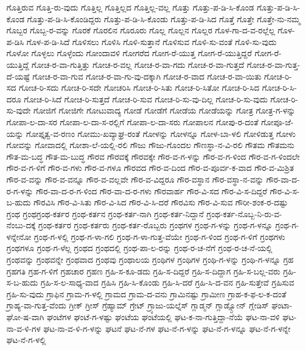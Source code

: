 {ಗೊತ್ತಿರುವ
ಗೊತ್ತಿ-ರು-ವುದು
ಗೊತ್ತಿಲ್ಲ
ಗೊತ್ತಿಲ್ಲದ
ಗೊತ್ತಿಲ್ಲ-ವಲ್ಲ
ಗೊತ್ತು
ಗೊತ್ತು-ಪ-ಡಿ-ಸಿ-ಕೊಂಡ
ಗೊತ್ತು-ಪ-ಡಿ-ಸಿ-ಕೊಂಡ
ಗೊತ್ತು-ಪ-ಡಿ-ಸಿ-ಕೊಂಡಿದ್ದರು
ಗೊತ್ತು-ಪ-ಡಿ-ಸಿ-ಕೊಂಡು
ಗೊತ್ತು-ಪ-ಡಿ-ಸಿದ
ಗೊತ್ತೆ
ಗೊತ್ತೇ
ಗೊತ್ತೇ-ನು-ನಮ್ಮ
ಗೊಬ್ಬರ
ಗೊಬ್ಬ-ರ-ವನ್ನು
ಗೊರಕೆ
ಗೊರಲಿನ
ಗೊರೂರು
ಗೊಲ್ಲ
ಗೊಲ್ಲನ
ಗೊಲ್ಲರ
ಗೊಳ-ಗಾ-ದ-ವ-ರಲ್ಲೆಲ್ಲ
ಗೊಳ-ಪ-ಡಿಸಿ
ಗೊಳ-ಪ-ಡಿ-ಸಿದೆ
ಗೊಳಿಸಲು
ಗೊಳಿಸಿ
ಗೊಳಿ-ಸುತ್ತಾನೆ
ಗೊಳಿಸುವ
ಗೊಳಿ-ಸು-ವಂತೆ
ಗೊಳಿ-ಸು-ವುದು
ಗೊಳೋ
ಗೊಳ್ಳಲು
ಗೊಳ್ಳೆಂದು
ಗೋಂದಾವಳಿ
ಗೋಗರೆದ
ಗೋಗ-ರೆ-ಯುತ್ತ
ಗೋಗ-ರೆ-ಯುತ್ತಿದ್ದರೆ
ಗೋಗ-ರೆ-ಯುತ್ತಿದ್ದೆ
ಗೋಚ-ರ-ವಾ-ಗುತ್ತಿತ್ತು
ಗೋಚ-ರ-ವಲ್ಲ
ಗೋಚ-ರ-ವಾ-ಗದು
ಗೋಚ-ರ-ವಾ-ಗುತ್ತದೆ
ಗೋಚ-ರ-ವಾ-ಗುತ್ತ-ದೆ-ಯಷ್ಟೆ
ಗೋಚ-ರ-ವಾ-ಗುವ
ಗೋಚ-ರ-ವಾ-ಗು-ವು-ದಕ್ಕಾಗಿ
ಗೋಚ-ರ-ವಾದ
ಗೋಚ-ರ-ವಾ-ಯಿತು
ಗೋಚ-ರಿ-ಸದ
ಗೋಚ-ರಿ-ಸದು
ಗೋಚ-ರಿ-ಸದೇ
ಗೋಚರಿಸಿ
ಗೋಚ-ರಿ-ಸಿತು
ಗೋಚ-ರಿ-ಸಿತೋ
ಗೋಚ-ರಿ-ಸಿದ
ಗೋಚ-ರಿ-ಸಿ-ದರೂ
ಗೋಚ-ರಿ-ಸಿದೆ
ಗೋಚ-ರಿ-ಸುತ್ತದೆ
ಗೋಚ-ರಿ-ಸುವ
ಗೋಚ-ರಿ-ಸು-ವು-ದಿಲ್ಲ
ಗೋಚ-ರಿ-ಸು-ವುದು
ಗೋಚ-ರಿ-ಸು-ವುದೇ
ಗೋಜಿಗೆ
ಗೋಜಿಗೇ
ಗೋಟುವಾದ್ಯ
ಗೋಡೆ
ಗೋಡೆಗೆ
ಗೋಡೆಯ
ಗೋಡೆಯನ್ನು
ಗೋತ್ರ
ಗೋತ್ರ-ಗ-ಳನ್ನು
ಗೋಪಾ-ಲ-ದಾ-ಸರ
ಗೋಪಾ-ಲ-ದಾ-ಸ-ರಲ್ಲಿಗೆ
ಗೋಪಾ-ಲ-ದಾ-ಸರು
ಗೋಪಾಲನ
ಗೋಪು-ರ-ದಂತೆ
ಗೋಪೂ-ಜೆ-ಯನ್ನು
ಗೋಪ್ತೃತ್ವ-ವ-ರಣಂ
ಗೋಮು-ಖವ್ಯಾಘ್ರ-ರಂತೆ
ಗೋಳನ್ನು
ಗೋಳನ್ನೂ
ಗೋಳ-ಬಾ-ಳಲಿ
ಗೋಳಿಡುತ್ತ
ಗೋಳು
ಗೋವನ್ನು
ಗೋವಾದಲ್ಲಿ
ಗೋಶಾ-ಲೆ-ಯಲ್ಲಿ-ರಲಿ
ಗೌಜು
ಗೌಜು-ಗೊಂದಲ
ಗೌಣಸ್ಥಾ-ನ-ವಿ-ರಲಿ
ಗೌತಮ
ಗೌತಮನು
ಗೌತ-ಮ-ಬದ್ಧ
ಗೌತ-ಮ-ಬುದ್ಧ
ಗೌರವ
ಗೌರವಕ್ಕೆ
ಗೌರವಕ್ಕೇ
ಗೌರ-ವ-ಗ-ಳನ್ನು
ಗೌರ-ವ-ಗ-ಳಿಂದ
ಗೌರ-ವ-ಗ-ಳಿಂದಲೇ
ಗೌರ-ವ-ಗ-ಳಿಗೆ
ಗೌರ-ವ-ಗಳು
ಗೌರ-ವ-ಗಳೂ
ಗೌರವದ
ಗೌರ-ವ-ದಿಂದ
ಗೌರ-ವ-ಪೂರ್ವ-ಕ-ವಾದ
ಗೌರ-ವ-ಮಿಶ್ರಿತ
ಗೌರ-ವ-ವನ್ನು
ಗೌರ-ವ-ವನ್ನೂ
ಗೌರ-ವ-ವಲ್ಲವೇ
ಗೌರ-ವ-ವಿದ್ದರೂ
ಗೌರ-ವಸ್ಥಾನ
ಗೌರ-ವಸ್ಥಾ-ನ-ವನ್ನು
ಗೌರ-ವಾ-ದ-ರ-ಗ-ಳನ್ನು
ಗೌರ-ವಾ-ದ-ರ-ಗ-ಳಿಂದ
ಗೌರ-ವಾ-ದ-ರ-ಗಳು
ಗೌರವಾರ್ಹ
ಗೌರ-ವಿ-ಸದ
ಗೌರ-ವಿ-ಸ-ದಿದ್ದರೆ
ಗೌರ-ವಿ-ಸ-ಬ-ಹುದು
ಗೌರವಿಸಿ
ಗೌರ-ವಿ-ಸಿತು
ಗೌರ-ವಿ-ಸಿದ
ಗೌರ-ವಿ-ಸಿ-ದರೆ
ಗೌರವಿಸು
ಗೌರ-ವಿ-ಸುವ
ಗೌರೀ-ಶಂಕ-ರ-ದಷ್ಟು
ಗ್ರಂಥ
ಗ್ರಂಥಗ್ರಂಥ-ಕರ್ತರ
ಗ್ರಂಥ-ಕರ್ತನ
ಗ್ರಂಥ-ಕರ್ತ-ನಾಗಿ
ಗ್ರಂಥ-ಕರ್ತ-ನಿದ್ದಾನೆ
ಗ್ರಂಥ-ಕರ್ತ-ನೊಬ್ಬ-ನಿ-ರು-ವ-ನೆಂಬು-ದಕ್ಕೆ
ಗ್ರಂಥ-ಕರ್ತರ
ಗ್ರಂಥ-ಕರ್ತರು
ಗ್ರಂಥ-ಕರ್ತ-ರೊಬ್ಬರು
ಗ್ರಂಥಗಳ
ಗ್ರಂಥ-ಗ-ಳನ್ನು
ಗ್ರಂಥ-ಗ-ಳನ್ನೂ
ಗ್ರಂಥ-ಗ-ಳನ್ನೇನೋ
ಗ್ರಂಥ-ಗ-ಳಲ್ಲಿ
ಗ್ರಂಥ-ಗ-ಳಾ-ಗಲಿ
ಗ್ರಂಥ-ಗ-ಳಾ-ಗುತ್ತ-ವೆಯೇ
ಗ್ರಂಥ-ಗ-ಳಿಂದ
ಗ್ರಂಥ-ಗ-ಳಿಗೆ
ಗ್ರಂಥಗಳು
ಗ್ರಂಥಗಳೂ
ಗ್ರಂಥ-ಗ-ಳೆಲ್ಲ
ಗ್ರಂಥದ
ಗ್ರಂಥದಲ್ಲಿ
ಗ್ರಂಥ-ಪಾ-ಲ-ರನ್ನು
ಗ್ರಂಥ-ರ-ಚ-ನೆಗೆ
ಗ್ರಂಥ-ರ-ಚ-ನೆ-ಯಲ್ಲಿ
ಗ್ರಂಥವನ್ನು
ಗ್ರಂಥವನ್ನೇ
ಗ್ರಂಥವಾದ
ಗ್ರಂಥವು
ಗ್ರಂಥಾಲಯ
ಗ್ರಂಥಿಗಳ
ಗ್ರಂಥಿಗಳ
ಗ್ರಂಥಿ-ಗ-ಳನ್ನು
ಗ್ರಂಥಿ-ಗ-ಳನ್ನೂ
ಗ್ರಹ
ಗ್ರಹಗತಿ
ಗ್ರಹ-ಗ-ಳಿಗೆ
ಗ್ರಹಚಾರ
ಗ್ರಹಣ
ಗ್ರಹಿ-ಸ-ಕೂ-ಡದು
ಗ್ರಹಿ-ಸ-ದಿದ್ದರೆ
ಗ್ರಹಿ-ಸ-ದಿದ್ದಾಗ
ಗ್ರಹಿ-ಸ-ಬಲ್ಲ-ವರು
ಗ್ರಹಿ-ಸ-ಬ-ಹುದು
ಗ್ರಹಿ-ಸ-ಲ-ಸಾಧ್ಯ-ವಾದ
ಗ್ರಹಿಸಿ
ಗ್ರಹಿ-ಸಿ-ಕೊಂಡು
ಗ್ರಹಿ-ಸಿ-ದರೆ
ಗ್ರಹಿ-ಸಿ-ದ-ವನ
ಗ್ರಹಿ-ಸುತ್ತೇವೆ
ಗ್ರಹಿಸುವ
ಗ್ರಹಿ-ಸು-ವುದು
ಗ್ರಾಫಿನ
ಗ್ರಾಮ-ಗ-ಳಲ್ಲಿ
ಗ್ರಾಮದ
ಗ್ರಾಮ-ದ-ವನು
ಗ್ರಾಮಿನಷ್ಟು
ಗ್ರಾಮೀಣ
ಗ್ರಾಹ-ಕ-ಫ-ಲ-ಕ-ದಂತೆ
ಗ್ರಾಹ್ಯ-ವಾ-ಗುತ್ತ-ವೆಂದು
ಗ್ರೀಕ್
ಗ್ರೀಸ್
ಗ್ರೆಹ್ಯಾಮ್
ಗ್ರೇಟ್
ಗ್ರ್ಯಾಜು-ಯಲ್ನೆಸ್
ಗ್ಲಾಡ್ಮನ್
ಗ್ಲಾಡ್ಸ್ಟೋನ್
ಗ್ಲೇಡಿಸ್
ಘಂಟಾ-ಘೋ-ಷ-ವಾಗಿ
ಘಂಟೆಗಳ
ಘಂಟೆ-ಗ-ಳಷ್ಟು
ಘಂಟೆಯ
ಘಂಟೆಯಲ್ಲಿ
ಘಟ-ಕ-ನಾ-ಗುತ್ತಿದ್ದಾ-ನೆಯೆ
ಘಟ-ನಾ-ವಳಿ
ಘಟ-ನಾ-ವ-ಳಿ-ಗಳ
ಘಟ-ನಾ-ವ-ಳಿ-ಗ-ಳನ್ನು
ಘಟನೆ
ಘಟ-ನೆ-ಗಳ
ಘಟ-ನೆ-ಗ-ಳನ್ನು
ಘಟ-ನೆ-ಗ-ಳನ್ನೂ
ಘಟ-ನೆ-ಗ-ಳನ್ನೇ
ಘಟ-ನೆ-ಗ-ಳಲ್ಲಿ
}
